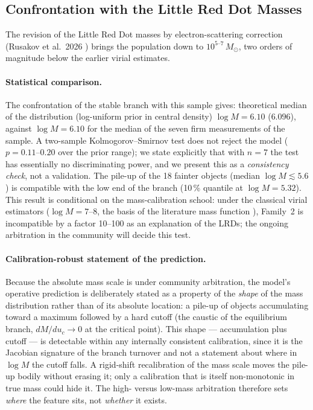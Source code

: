 \documentclass[11pt,a4paper]{article}
\theoremstyle{plain}
\theoremstyle{remark}
\begin{document}
\subsection{Confrontation with the Little Red Dot Masses}
\label{sec:lrd}
The revision of the Little Red Dot masses by electron-scattering correction (Rusakov et al.\ 2026 \cite{rusakov2026}) brings the population down to $10^{5\text{--}7}\,M_\odot$, two orders of magnitude below the earlier virial estimates.

\paragraph{Statistical comparison.} The confrontation of the stable branch with this sample gives: theoretical median of the distribution (log-uniform prior in central density) $\log M = 6.10$ ($6.096$), against $\log M = 6.10$ for the median of the seven firm measurements of the sample. A two-sample Kolmogorov--Smirnov test does not reject the model ($p = 0.11$--$0.20$ over the prior range); we state explicitly that with $n = 7$ the test has essentially no discriminating power, and we present this as a \emph{consistency check}, not a validation. The pile-up of the 18 fainter objects (median $\log M \lesssim 5.6$) is compatible with the low end of the branch (10\,\% quantile at $\log M = 5.32$). This result is conditional on the mass-calibration school: under the classical virial estimators ($\log M = 7$--$8$, the basis of the literature mass function \cite{jeon2026}), Family~2 is incompatible by a factor 10--100 as an explanation of the LRDs; the ongoing arbitration in the community will decide this test.

\paragraph{Calibration-robust statement of the prediction.} Because the absolute mass scale is under community arbitration, the model's operative prediction is deliberately stated as a property of the \emph{shape} of the mass distribution rather than of its absolute location: a pile-up of objects accumulating toward a maximum followed by a hard cutoff (the caustic of the equilibrium branch, $dM/du_c \to 0$ at the critical point). This shape --- accumulation plus cutoff --- is detectable within any internally consistent calibration, since it is the Jacobian signature of the branch turnover and not a statement about where in $\log M$ the cutoff falls. A rigid-shift recalibration of the mass scale moves the pile-up bodily without erasing it; only a calibration that is itself non-monotonic in true mass could hide it. The high- versus low-mass arbitration therefore sets \emph{where} the feature sits, not \emph{whether} it exists.
\end{document}
